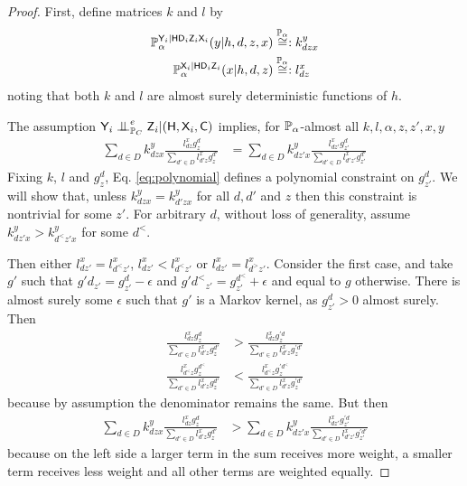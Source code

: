 \begin{proof}
First, define matrices $k$ and $l$ by
\begin{align}
    \mathbb{P}_\alpha^{\mathsf{Y}_i|\mathsf{H}\mathsf{D}_i\mathsf{Z}_i\mathsf{X}_i}(y|h,d,z,x)&\overset{\mathbb{P}_\alpha}{\cong}: k^y_{dzx}\\
    \mathbb{P}_\alpha^{\mathsf{X}_i|\mathsf{H}\mathsf{D}_i\mathsf{Z}_i}(x|h,d,z)&\overset{\mathbb{P}_\alpha}{\cong}: l^x_{dz}
\end{align}
noting that both $k$ and $l$ are almost surely deterministic functions of $h$.

The assumption $\RV{Y}_i\CI^e_{\prob{P}_C} \RV{Z}_i|(\RV{H},\RV{X}_i,\RV{C})$ implies, for $\mathbb{P}_\alpha$-almost all $k,l,\alpha,z,z',x,y$
\begin{align}
    \sum_{d\in D} k^y_{dzx}\frac{l^x_{dz}g^d_z}{\sum_{d'\in D}l^x_{d'z}g^{d'}_z}&= \sum_{d\in D} k^y_{dz'x}\frac{l^x_{dz'}g^d_{z'}}{\sum_{d'\in D}l^x_{d'z'}g^{d'}_{z'}}\label{eq:polynomial}
\end{align}
Fixing $k$, $l$ and $g^d_z$, Eq. \eqref{eq:polynomial} defines a polynomial constraint on $g^d_{z'}$. We will show that, unless $k^y_{dzx}=k^y_{d'zx}$ for all $d,d'$ and $z$ then this constraint is nontrivial for some $z'$. For arbitrary $d$, without loss of generality, assume $k^y_{dz'x} > k^y_{d^<z'x}$ for some $d^<$. 

Then either $l^x_{dz'}=l^x_{d^<z'}$, $l^x_{dz'}< l^x_{d^<z'}$ or $l^x_{dz'}=l^x_{d^>z'}$. Consider the first case, and take $g'$ such that $g{\prime d}_{z'}=g^{d}_{z'}-\epsilon$ and $g{\prime d^<}_{z'}=g^{d^<}_{z'}+\epsilon$ and equal to $g$ otherwise. There is almost surely some $\epsilon$ such that $g'$ is a Markov kernel, as $g^{d}_{z'}>0$ almost surely. Then
\begin{align}
    \frac{l^x_{dz}g^d_z}{\sum_{d'\in D}l^x_{d'z}g^{d'}_z} &> \frac{l^x_{dz}g^{\prime d}_z}{\sum_{d'\in D}l^x_{d'z}g^{\prime d'}_z}\\
    \frac{l^x_{d^<z}g^{d^<}_z}{\sum_{d'\in D}l^x_{d'z}g^{d'}_z} &< \frac{l^x_{d^<z}g^{\prime d^<}_z}{\sum_{d'\in D}l^x_{d'z}g^{\prime d'}_z}
\end{align}
because by assumption the denominator remains the same. But then
\begin{align}
    \sum_{d\in D} k^y_{dzx}\frac{l^x_{dz}g^d_z}{\sum_{d'\in D}l^x_{d'z}g^{d'}_z}&> \sum_{d\in D} k^y_{dz'x}\frac{l^x_{dz'}g^{\prime d}_{z'}}{\sum_{d'\in D}l^x_{d'z'}g^{\prime d'}_{z'}}\label{eq:inequality}
\end{align}
because on the left side a larger term in the sum receives more weight, a smaller term receives less weight and all other terms are weighted equally.


\end{proof}
